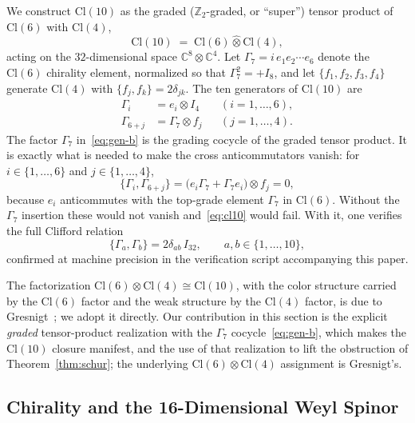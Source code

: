 \documentclass[12pt]{article}
\theoremstyle{remark}
\newcommand{\cl}{\mathrm{Cl}}
\newcommand{\Cplx}{\mathbb{C}}
\newcommand{\grtensor}{\mathbin{\widehat{\otimes}}}  %
\begin{document}
We construct $\cl(10)$ as the graded ($\mathbb{Z}_2$-graded, or ``super'')
tensor product of $\cl(6)$ with $\cl(4)$,
\begin{equation}
	\cl(10) \;=\; \cl(6)\grtensor\cl(4),
	\label{eq:cl10}
\end{equation}
acting on the $32$-dimensional space $\Cplx^8\otimes\Cplx^4$.  Let
$\Gamma_7=i\,e_1e_2\cdots e_6$ denote the $\cl(6)$ chirality element, normalized
so that $\Gamma_7^2=+I_8$, and let $\{f_1,f_2,f_3,f_4\}$ generate $\cl(4)$ with
$\{f_j,f_k\}=2\delta_{jk}$.  The ten generators of $\cl(10)$ are
\begin{align}
	\Gamma_i     &= e_i\otimes I_4        && (i=1,\ldots,6),
	\label{eq:gen-a}\\
	\Gamma_{6+j} &= \Gamma_7\otimes f_j   && (j=1,\ldots,4).
	\label{eq:gen-b}
\end{align}
The factor $\Gamma_7$ in~\eqref{eq:gen-b} is the grading cocycle of the graded
tensor product.  It is exactly what is needed to make the cross anticommutators
vanish: for $i\in\{1,\ldots,6\}$ and $j\in\{1,\ldots,4\}$,
\begin{equation}
	\{\Gamma_i,\Gamma_{6+j}\}
	= \bigl(e_i\Gamma_7 + \Gamma_7 e_i\bigr)\otimes f_j
	= 0,
	\label{eq:cross}
\end{equation}
because $e_i$ anticommutes with the top-grade element $\Gamma_7$ in $\cl(6)$.
Without the $\Gamma_7$ insertion these would not vanish and~\eqref{eq:cl10}
would fail.  With it, one verifies the full Clifford relation
\begin{equation}
	\{\Gamma_a,\Gamma_b\} = 2\delta_{ab}\,I_{32},
	\qquad a,b\in\{1,\ldots,10\},
	\label{eq:closure}
\end{equation}
confirmed at machine precision in the verification script accompanying this
paper.

The factorization $\cl(6)\otimes\cl(4)\cong\cl(10)$, with the color structure
carried by the $\cl(6)$ factor and the weak structure by the $\cl(4)$ factor, is
due to Gresnigt~\cite{Gresnigt2020}; we adopt it directly.  Our contribution in
this section is the explicit \emph{graded} tensor-product realization with the
$\Gamma_7$ cocycle~\eqref{eq:gen-b}, which makes the $\cl(10)$ closure manifest,
and the use of that realization to lift the obstruction of
Theorem~\ref{thm:schur}; the underlying $\cl(6)\otimes\cl(4)$ assignment is
Gresnigt's.

\subsection{Chirality and the 16-Dimensional Weyl Spinor}
\label{sec:chirality}
\end{document}
